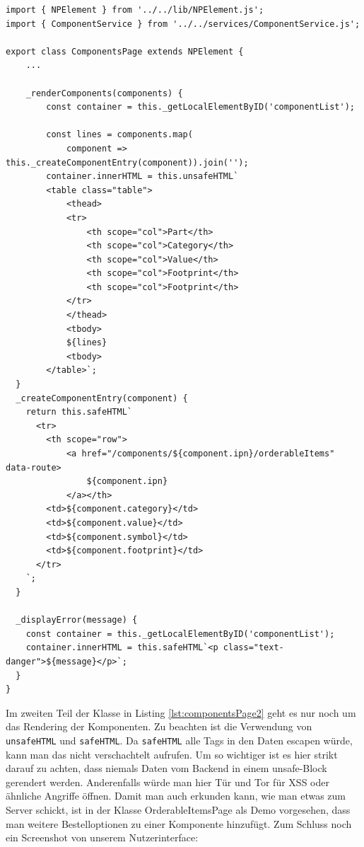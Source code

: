 \begin{listing}[H]
\begin{verbatim}
import { NPElement } from '../../lib/NPElement.js';
import { ComponentService } from '../../services/ComponentService.js';

export class ComponentsPage extends NPElement {
    ...
    
    _renderComponents(components) {
        const container = this._getLocalElementByID('componentList');

        const lines = components.map(
            component => this._createComponentEntry(component)).join('');
        container.innerHTML = this.unsafeHTML`
        <table class="table">
            <thead>
            <tr>
                <th scope="col">Part</th>
                <th scope="col">Category</th>
                <th scope="col">Value</th>
                <th scope="col">Footprint</th>
                <th scope="col">Footprint</th>
            </tr>
            </thead>
            <tbody>
            ${lines}
            <tbody>
        </table>`;
  }
  _createComponentEntry(component) {
    return this.safeHTML`
      <tr>
        <th scope="row">
            <a href="/components/${component.ipn}/orderableItems" data-route>
                ${component.ipn}
            </a></th>
        <td>${component.category}</td>
        <td>${component.value}</td>
        <td>${component.symbol}</td>        
        <td>${component.footprint}</td>        
      </tr>
    `;
  }

  _displayError(message) {
    const container = this._getLocalElementByID('componentList');
    container.innerHTML = this.safeHTML`<p class="text-danger">${message}</p>`;
  }
}
\end{verbatim}
\caption{ComponentsPage.js - Teil 2}
\label{lst:componentsPage2}
\end{listing}

Im zweiten Teil der Klasse in Listing \ref{lst:componentsPage2} geht es nur
noch um das Rendering der Komponenten. Zu beachten ist die Verwendung von 
\texttt{unsafeHTML} und \texttt{safeHTML}. Da \texttt{safeHTML} alle Tags
in den Daten escapen würde, kann man das nicht verschachtelt aufrufen. Um so
wichtiger ist es hier strikt darauf zu achten, dass niemals Daten vom
Backend in einem unsafe-Block gerendert werden. Anderenfalls würde man hier
Tür und Tor für XSS oder ähnliche Angriffe öffnen. Damit man auch erkunden
kann, wie man etwas zum Server schickt, ist in der Klasse OrderableItemsPage
als Demo vorgesehen, dass man weitere Bestelloptionen zu einer Komponente
hinzufügt. Zum Schluss noch ein Screenshot von unserem Nutzerinterface:


